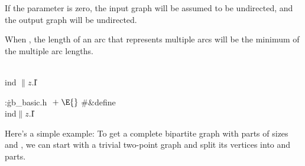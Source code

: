 If the  parameter is zero, the input graph will be assumed to
be undirected, and the output graph will be undirected.

When , the length of an arc that represents multiple
arcs
will be the minimum of the multiple arc lengths.

\Y\B\4\D\\{ind}\5
$\|z.{}$\|I\par
\Y\B\4:\.{gb\_basic.h }\X${}\mathrel+\E{}$\6
\8\#\&{define} \\{ind}\5${}\|z.{}$\|I\par
\fi

Here's a simple example: To get a complete bipartite graph with
parts of sizes  and , we can start with a trivial
two-point
graph and split its vertices into  and  parts.

